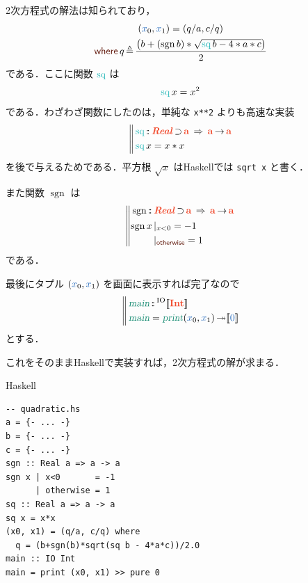 \documentclass[a5paper,twoside,fleqn,draft]{jsbook}
\def\[{[\![}
\def\]{]\!]}
\DeclareMathOperator{\sgn}{sgn}
\def\keywordColor{Sepia}
\def\varColor{NavyBlue}
\def\funcColor{BlueGreen}
\def\actionColor{PineGreen}
\def\typeColor{RedOrange}
\newcommand{\programminglanguage}[1]{\textsf{#1}}
\newcommand{\haskell}{\programminglanguage{Haskell}}
\newcommand{\code}[1]{\texttt{#1}}
\newenvironment{haskellcode}{\begin{itembox}[r]{\haskell}}{\end{itembox}}
\newcommand{\mBrace}{\Vert}
\newcommand{\mKeyword}[1]{\textcolor{\keywordColor}{\mathsf{#1}}}
\newcommand{\mOtherwiseKeyword}{\mKeyword{otherwise}}
\newcommand{\mWhereKeyword}{\mKeyword{where}}
\DeclareMathOperator{\mOtherwise}{\mOtherwiseKeyword}
\DeclareMathOperator{\mSuperClass}{\;\Rightarrow\;}
\DeclareMathOperator{\mSuperSet}{\supset}
\DeclareMathOperator{\mWhere}{\mWhereKeyword}
\newcommand{\mVar}[1]{\textcolor{\varColor}{#1}}
\newcommand{\mXVar}{\mVar{x}}
\newcommand{\mSpecialFunc}[1]{\textcolor{\funcColor}{\textrm{#1}}}
\DeclareMathOperator{\mSq}{\mSpecialFunc{sq}}
\newcommand{\mActionLong}[1]{\textcolor{\actionColor}{\textsl{#1}}}
\DeclareMathOperator{\mMain}{\mActionLong{main}}
\DeclareMathOperator{\mPrint}{\mActionLong{print}}
\DeclareMathOperator{\mBindRightIgnore}{\twoheadrightarrow}
\DeclareMathOperator{\mFuncArrow}{\rightarrow}
\DeclareMathOperator{\mIn}{{:\!:}}
\DeclareMathOperator{\mLetEq}{\triangleq}
\newcommand{\mType}[1]{\textcolor{\typeColor}{\mathbf{#1}}}
\newcommand{\mA}{\mType{a}}
\newcommand{\mIntType}{\mType{Int}}
\newcommand{\mTypeAssemble}[2]{{}^\mathrm{#1}\[\mType{#2}\]}
\newcommand{\mIOType}[1]{\mTypeAssemble{IO}{#1}}
\newcommand{\mIOIntType}{\mIOType{\mIntType}}
\newcommand{\mPureWith}[1]{\[\mVar{#1}\]}
\newcommand{\mTypeClass}[1]{\textcolor{\typeColor}{\textbf{\textit{#1}}}}
\newcommand{\mRealTypeClass}{\mTypeClass{Real}}
\newcommand{\mGuard}[1]{\mathop{\mid_{#1}}}
\newcommand{\mProjEXP}[2]{#1\mFuncArrow#2} %
\begin{document}
2次方程式の解法は知られており，
\begin{multline}
  (\mXVar_0,\mXVar_1)=(q/a,c/q)\\
  \mWhere q\mLetEq\frac{\left(b+(\sgn b)*\sqrt{\mSq b-4*a*c}\right)}{2}
\end{multline}
である．ここに関数 $\mSq$ は
\begin{equation}
  \mSq x=x^2
\end{equation}
である．わざわざ関数にしたのは，単純な \code{x**2} よりも高速な実装
\begin{equation}
  \left\mBrace
  \begin{aligned}
    &\mSq\mIn\mRealTypeClass\mSuperSet\mA
    \mSuperClass\mProjEXP{\mA}{\mA}\\
    &\mSq x=x*x
  \end{aligned}
  \right.
\end{equation}
を後で与えるためである．平方根 $\sqrt{x}$ は\haskell では \code{sqrt
  x} と書く．

また関数 $\sgn$ は
\begin{equation}
  \left\mBrace
  \begin{aligned}
    {}&\sgn\mIn{}\mRealTypeClass\mSuperSet\mA
    \mSuperClass\mProjEXP{\mA }{\mA }\\
    {}&
    \begin{aligned}
      \sgn x&\mGuard{x<0}=-1\\
      &\mGuard{\mOtherwise}=1
    \end{aligned}
  \end{aligned}
  \right.
\end{equation}
である．

最後にタプル $(\mXVar_0,\mXVar_1)$ を画面に表示すれば完了なので
\begin{equation}
  \left\mBrace
  \begin{aligned}
    {}&\mMain\mIn\mIOIntType\\
    {}&\mMain=\mPrint(\mXVar_0,\mXVar_1)\mBindRightIgnore\mPureWith{0}
  \end{aligned}
  \right.
\end{equation}
とする．

これをそのまま\haskell で実装すれば，2次方程式の解が求まる．
\begin{haskellcode}
\begin{verbatim}
-- quadratic.hs
a = {- ... -}
b = {- ... -}
c = {- ... -}
sgn :: Real a => a -> a
sgn x | x<0       = -1
      | otherwise = 1
sq :: Real a => a -> a
sq x = x*x
(x0, x1) = (q/a, c/q) where
  q = (b+sgn(b)*sqrt(sq b - 4*a*c))/2.0
main :: IO Int
main = print (x0, x1) >> pure 0
\end{verbatim}
\end{haskellcode}
\end{document}
